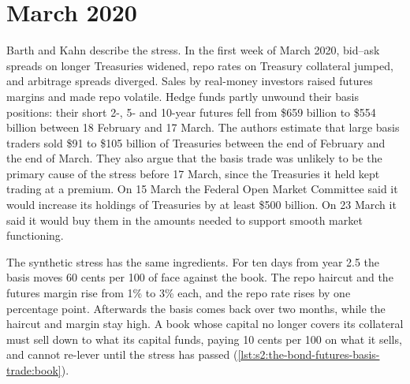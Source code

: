 \begin{omfigure}

\label{fig:s2:the-bond-futures-basis-trade:tff}
\end{omfigure}

\section{March 2020}

Barth and Kahn describe the stress. In the first week of March 2020, bid--ask spreads on longer Treasuries widened, repo rates on Treasury collateral
jumped, and arbitrage spreads diverged. Sales by real-money investors raised futures margins and made repo volatile. Hedge funds partly unwound their
basis positions: their short 2-, 5- and 10-year futures fell from \$659 billion to \$554 billion between 18 February and 17 March. The authors estimate
that large basis traders sold \$91 to \$105 billion of Treasuries between the end of February and the end of March. They also argue that the basis
trade was unlikely to be the primary cause of the stress before 17 March, since the Treasuries it held kept trading at a premium. On 15 March the
Federal Open Market Committee said it would increase its holdings of Treasuries by at least \$500 billion. On 23 March it said it would buy them in the
amounts needed to support smooth market functioning.

The synthetic stress has the same ingredients. For ten days from year 2.5 the basis moves 60 cents per 100 of face against the book. The repo haircut
and the futures margin rise from 1\% to 3\% each, and the repo rate rises by one percentage point. Afterwards the basis comes back over two months,
while the haircut and margin stay high. A book whose capital no longer covers its collateral must sell down to what its capital funds, paying 10 cents
per 100 on what it sells, and cannot re-lever until the stress has passed (\cref{lst:s2:the-bond-futures-basis-trade:book}).


